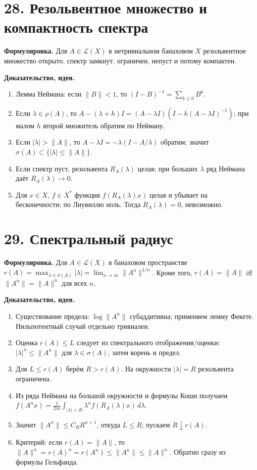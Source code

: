 \documentclass[10pt,a4paper]{article}
\newcommand{\X}{X}
\begin{document}
	\section*{28. Резольвентное множество и компактность спектра}
	\textbf{Формулировка.} Для $A\in\mathcal L(\X)$ в нетривиальном банаховом $\X$ резольвентное множество открыто, спектр замкнут, ограничен, непуст и потому компактен.

	\textbf{Доказательство, идея.}
	\begin{enumerate}
		\item Лемма Неймана: если $\|B\|<1$, то $(I-B)^{-1}=\sum_{k\ge0}B^k$.
		\item Если $\lambda\in\rho(A)$, то $A-(\lambda+h)I=(A-\lambda I)(I-h(A-\lambda I)^{-1})$; при малом $h$ второй множитель обратим по Нейману.
		\item Если $|\lambda|>\|A\|$, то $A-\lambda I=-\lambda(I-A/\lambda)$ обратим; значит $\sigma(A)\subset\{|\lambda|\le\|A\|\}$.
		\item Если спектр пуст, резольвента $R_A(\lambda)$ целая; при больших $\lambda$ ряд Неймана даёт $R_A(\lambda)\to0$.
		\item Для $x\in\X$, $f\in\X^\ast$ функция $f(R_A(\lambda)x)$ целая и убывает на бесконечности; по Лиувиллю ноль. Тогда $R_A(\lambda)=0$, невозможно.
	\end{enumerate}

	\section*{29. Спектральный радиус}
	\textbf{Формулировка.} Для $A\in\mathcal L(\X)$ в банаховом пространстве $r(A)=\max_{\lambda\in\sigma(A)}|\lambda|=\lim_{n\to\infty}\|A^n\|^{1/n}$. Кроме того, $r(A)=\|A\|$ iff $\|A^n\|=\|A\|^n$ для всех $n$.

	\textbf{Доказательство, идея.}
	\begin{enumerate}
		\item Существование предела: $\log\|A^n\|$ субаддитивна; применяем лемму Фекете. Нильпотентный случай отдельно тривиален.
		\item Оценка $r(A)\le L$ следует из спектрального отображения/оценки: $|\lambda|^n\le\|A^n\|$ для $\lambda\in\sigma(A)$, затем корень и предел.
		\item Для $L\le r(A)$ берём $R>r(A)$. На окружности $|\lambda|=R$ резольвента ограничена.
		\item Из ряда Неймана на большой окружности и формулы Коши получаем $f(A^nx)=\frac1{2\pi i}\int_{|\lambda|=R}\lambda^n f(R_A(\lambda)x)\,d\lambda$.
		\item Значит $\|A^n\|\le C_RR^{n+1}$, откуда $L\le R$; пускаем $R\downarrow r(A)$.
		\item Критерий: если $r(A)=\|A\|$, то $\|A\|^n=r(A)^n=r(A^n)\le\|A^n\|\le\|A\|^n$. Обратно сразу из формулы Гельфанда.
	\end{enumerate}
\end{document}
